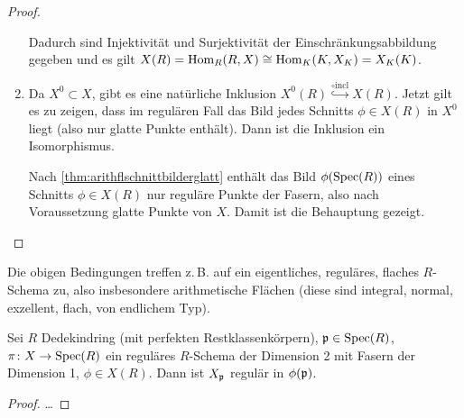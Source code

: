 \documentclass[german]{scrreprt}
\begin{document}
\begin{Satz}
\begin{proof}
\begin{enumerate}[label=(\roman*)]
\begin{center}
      \end{center}
      Dadurch sind Injektivität und Surjektivität der
      Einschränkungsabbildung gegeben und es gilt
      $X(R)=\operatorname{Hom}_R(R,X)\cong\operatorname{Hom}_{K}(K,X_{K})=X_{K}(K)$.
    \item Da $X^0\subset X$, gibt es eine natürliche Inklusion
      $X^0(R)\overset{\circ \text{incl}}{\hookrightarrow} X(R)$.
      Jetzt gilt es zu zeigen, dass im regulären Fall das Bild jedes
      Schnitts $\phi\in X(R)$ in $X^0$ liegt (also nur glatte Punkte
      enthält). Dann ist die Inklusion ein Isomorphismus.

      
      Nach \autoref{thm:arithflschnittbilderglatt} enthält das Bild
      $\phi(\operatorname{Spec}(R))$ eines Schnitts $\phi\in X(R)$ nur reguläre
      Punkte der Fasern, also nach Voraussetzung glatte Punkte von $X$.
      Damit ist die Behauptung gezeigt.
    \end{enumerate}
  \end{proof}
\end{Satz}

\begin{Bemerkung}
  Die obigen Bedingungen treffen z.\,B. auf ein eigentliches,
  reguläres, flaches $R$-Schema zu, also insbesondere arithmetische
  Flächen (diese sind integral, normal, exzellent, flach, von
  endlichem Typ).
\end{Bemerkung}

\begin{Lemma}\label{thm:arithflschnittbilderglatt}
  Sei $R$ Dedekindring (mit perfekten Restklassenkörpern),
  $\mathfrak{p}\in\operatorname{Spec}(R)$,
  $\pi\colon X\to\operatorname{Spec}(R)$ ein reguläres $R$-Schema der Dimension 2
  mit Fasern der Dimension 1,
  $\phi\in X(R)$.
  Dann ist $X_{\mathfrak{p}}$ regulär in $\phi(\mathfrak{p})$.
  \cite[Proposition IV.4.3]{silverman2}
  \begin{proof}
    …  
  \end{proof}
\end{Lemma}
\end{document}
